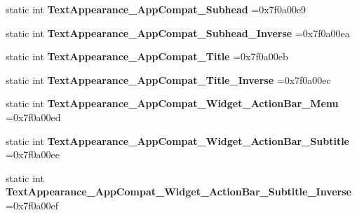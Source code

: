 \begin{DoxyCompactItemize}
static int {\bfseries Text\+Appearance\+\_\+\+App\+Compat\+\_\+\+Subhead} =0x7f0a00e9
\item 
\mbox{\label{classandroid_1_1support_1_1graphics_1_1drawable_1_1R_1_1style_a0b2e9e01dd74e6fad3b2c693748ba364}} 
static int {\bfseries Text\+Appearance\+\_\+\+App\+Compat\+\_\+\+Subhead\+\_\+\+Inverse} =0x7f0a00ea
\item 
\mbox{\label{classandroid_1_1support_1_1graphics_1_1drawable_1_1R_1_1style_aaf0ad9022096b393c3e682e5a35aaab7}} 
static int {\bfseries Text\+Appearance\+\_\+\+App\+Compat\+\_\+\+Title} =0x7f0a00eb
\item 
\mbox{\label{classandroid_1_1support_1_1graphics_1_1drawable_1_1R_1_1style_a426a5d7afc61221092d345e0e47f7284}} 
static int {\bfseries Text\+Appearance\+\_\+\+App\+Compat\+\_\+\+Title\+\_\+\+Inverse} =0x7f0a00ec
\item 
\mbox{\label{classandroid_1_1support_1_1graphics_1_1drawable_1_1R_1_1style_a8e9786a4b1e1a9eba19cd408df62f28a}} 
static int {\bfseries Text\+Appearance\+\_\+\+App\+Compat\+\_\+\+Widget\+\_\+\+Action\+Bar\+\_\+\+Menu} =0x7f0a00ed
\item 
\mbox{\label{classandroid_1_1support_1_1graphics_1_1drawable_1_1R_1_1style_a0acb9fed52a3e3151f01a02593a2bd42}} 
static int {\bfseries Text\+Appearance\+\_\+\+App\+Compat\+\_\+\+Widget\+\_\+\+Action\+Bar\+\_\+\+Subtitle} =0x7f0a00ee
\item 
\mbox{\label{classandroid_1_1support_1_1graphics_1_1drawable_1_1R_1_1style_abada2a3036e88447625821770d4e5e5a}} 
static int {\bfseries Text\+Appearance\+\_\+\+App\+Compat\+\_\+\+Widget\+\_\+\+Action\+Bar\+\_\+\+Subtitle\+\_\+\+Inverse} =0x7f0a00ef
\item 
\mbox{\label{classandroid_1_1support_1_1graphics_1_1drawable_1_1R_1_1style_a855fb516b45e04a1b632aa91f66296c9}} 

\end{DoxyCompactItemize}
